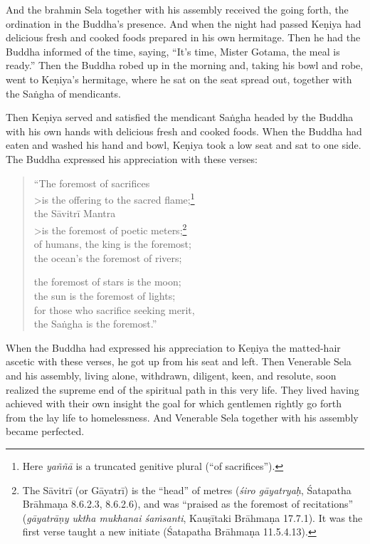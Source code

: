 \documentclass[12pt,openany]{book}%
\begin{document}
And the brahmin Sela together with his assembly received the going forth, the ordination in the Buddha’s presence. And when the night had passed \textsanskrit{Keṇiya} had delicious fresh and cooked foods prepared in his own hermitage. Then he had the Buddha informed of the time, saying, “It’s time, Mister Gotama, the meal is ready.” Then the Buddha robed up in the morning and, taking his bowl and robe, went to \textsanskrit{Keṇiya}’s hermitage, where he sat on the seat spread out, together with the \textsanskrit{Saṅgha} of mendicants. 

Then \textsanskrit{Keṇiya} served and satisfied the mendicant \textsanskrit{Saṅgha} headed by the Buddha with his own hands with delicious fresh and cooked foods. When the Buddha had eaten and washed his hand and bowl, \textsanskrit{Keṇiya} took a low seat and sat to one side. The Buddha expressed his appreciation with these verses: 

\begin{verse}%
“The foremost of sacrifices \\>is the offering to the sacred flame;\footnote{Here \textit{\textsanskrit{yaññā}} is a truncated genitive plural (“of sacrifices”). } \\
the \textsanskrit{Sāvitrī} Mantra \\>is the foremost of poetic meters;\footnote{The \textsanskrit{Sāvitrī} (or \textsanskrit{Gāyatrī}) is the “head” of metres (\textit{\textsanskrit{śiro} \textsanskrit{gāyatryaḥ}}, Śatapatha \textsanskrit{Brāhmaṇa}  8.6.2.3, 8.6.2.6), and was “praised as the foremost of recitations” (\textit{\textsanskrit{gāyatrāṇy} uktha mukhanai \textsanskrit{śaṁsanti}}, \textsanskrit{Kauṣītaki} \textsanskrit{Brāhmaṇa} 17.7.1). It was the first verse taught a new initiate (Śatapatha \textsanskrit{Brāhmaṇa} 11.5.4.13). } \\
of humans, the king is the foremost; \\
the ocean’s the foremost of rivers; 

the foremost of stars is the moon; \\
the sun is the foremost of lights; \\
for those who sacrifice seeking merit, \\
the \textsanskrit{Saṅgha} is the foremost.” 

%
\end{verse}

When the Buddha had expressed his appreciation to \textsanskrit{Keṇiya} the matted-hair ascetic with these verses, he got up from his seat and left. Then Venerable Sela and his assembly, living alone, withdrawn, diligent, keen, and resolute, soon realized the supreme end of the spiritual path in this very life. They lived having achieved with their own insight the goal for which gentlemen rightly go forth from the lay life to homelessness. And Venerable Sela together with his assembly became perfected. 
\end{document}
